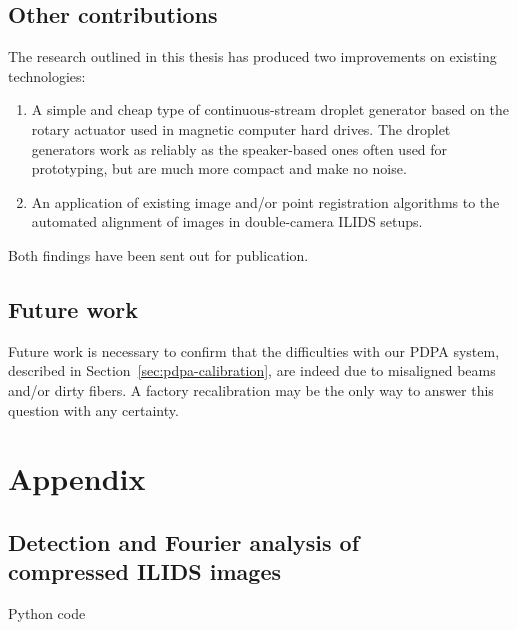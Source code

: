 \documentclass[11.5pt,oneside]{book}
\newcommand*{\secref}[1]{Section~\ref{#1}}
\begin{document}
\section{Other contributions}
The research outlined in this thesis has produced two improvements on existing
technologies:
\begin{enumerate}
  \item A simple and cheap type of continuous-stream droplet generator based on
    the rotary actuator used in magnetic computer hard drives. The droplet generators 
    work as reliably as the speaker-based ones often used for prototyping, but
    are much more compact and make no noise.
  \item An application of existing image and/or point registration algorithms to
    the automated alignment of images in double-camera ILIDS setups.
\end{enumerate}
Both findings have been sent out for publication.

\section{Future work}
Future work is necessary to confirm that the difficulties with our PDPA system,
described in \secref{sec:pdpa-calibration}, are indeed due to misaligned beams
and/or dirty fibers. A factory recalibration may be the only way to answer this
question with any certainty.



\pagebreak
\appendix
\chapter{Appendix}
\section*{Detection and Fourier analysis of\\compressed ILIDS images}
Python code
\end{document}
